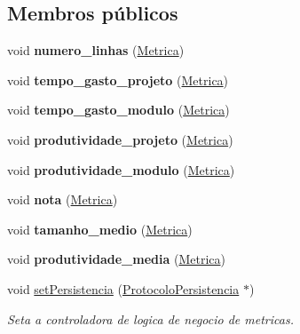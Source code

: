 \subsection*{\-Membros públicos}
\begin{DoxyCompactItemize}
\item 
\hypertarget{class_cntr_l_n_metrica_a7552e5964b9f7f5fb088465d5a8c4cc1}{
void {\bfseries numero\-\_\-linhas} (\hyperlink{class_metrica}{\-Metrica})}
\label{class_cntr_l_n_metrica_a7552e5964b9f7f5fb088465d5a8c4cc1}

\item 
\hypertarget{class_cntr_l_n_metrica_a2fcf7da5433658011c532fe53d228df6}{
void {\bfseries tempo\-\_\-gasto\-\_\-projeto} (\hyperlink{class_metrica}{\-Metrica})}
\label{class_cntr_l_n_metrica_a2fcf7da5433658011c532fe53d228df6}

\item 
\hypertarget{class_cntr_l_n_metrica_a5e14dd065f8d038751f807e8e8d0e1e4}{
void {\bfseries tempo\-\_\-gasto\-\_\-modulo} (\hyperlink{class_metrica}{\-Metrica})}
\label{class_cntr_l_n_metrica_a5e14dd065f8d038751f807e8e8d0e1e4}

\item 
\hypertarget{class_cntr_l_n_metrica_a67f89becc8ea57d771e41a41fce93f98}{
void {\bfseries produtividade\-\_\-projeto} (\hyperlink{class_metrica}{\-Metrica})}
\label{class_cntr_l_n_metrica_a67f89becc8ea57d771e41a41fce93f98}

\item 
\hypertarget{class_cntr_l_n_metrica_a9e89725ffd87ffdfdce30a0b18b95896}{
void {\bfseries produtividade\-\_\-modulo} (\hyperlink{class_metrica}{\-Metrica})}
\label{class_cntr_l_n_metrica_a9e89725ffd87ffdfdce30a0b18b95896}

\item 
\hypertarget{class_cntr_l_n_metrica_a00ede5b3b0bce437a36c993411dd95a1}{
void {\bfseries nota} (\hyperlink{class_metrica}{\-Metrica})}
\label{class_cntr_l_n_metrica_a00ede5b3b0bce437a36c993411dd95a1}

\item 
\hypertarget{class_cntr_l_n_metrica_a0c6abff6ebfea0e395080d1aeaf34bf9}{
void {\bfseries tamanho\-\_\-medio} (\hyperlink{class_metrica}{\-Metrica})}
\label{class_cntr_l_n_metrica_a0c6abff6ebfea0e395080d1aeaf34bf9}

\item 
\hypertarget{class_cntr_l_n_metrica_a142591518e20ec5bf5f3376df5e41e85}{
void {\bfseries produtividade\-\_\-media} (\hyperlink{class_metrica}{\-Metrica})}
\label{class_cntr_l_n_metrica_a142591518e20ec5bf5f3376df5e41e85}

\item 
void \hyperlink{class_cntr_l_n_metrica_ab55f87c1571c1c5766ae085d82ca8521}{set\-Persistencia} (\hyperlink{class_protocolo_persistencia}{\-Protocolo\-Persistencia} $\ast$)
\begin{DoxyCompactList}\small\item\em \-Seta a controladora de logica de negocio de metricas. \end{DoxyCompactList}\end{DoxyCompactItemize}
